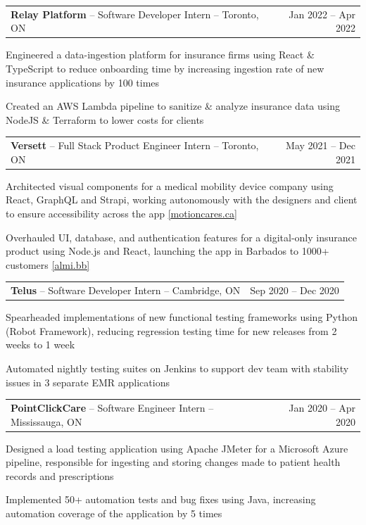 \documentclass[letterpaper,10pt]{article}
\makeatletter
\newcommand{\entry}[2]{%
  \noindent\begin{tabularx}{\linewidth}{@{}X r@{}}
    #1 & #2 \\
  \end{tabularx}%
}
\makeatother
\begin{document}
\entry{\textbf{Relay Platform} -- Software Developer Intern -- Toronto, ON}{Jan 2022 -- Apr 2022}
\begin{tight}
  \item Engineered a data-ingestion platform for insurance firms using React \& TypeScript to reduce onboarding time by increasing ingestion rate of new insurance applications by 100 times
  \item Created an AWS Lambda pipeline to sanitize \& analyze insurance data using NodeJS \& Terraform to lower costs for clients
\end{tight}

\entry{\textbf{Versett} -- Full Stack Product Engineer Intern -- Toronto, ON}{May 2021 -- Dec 2021}
\begin{tight}
  \item Architected visual components for a medical mobility device company using React, GraphQL and Strapi, working autonomously with the designers and client to ensure accessibility across the app \href{https://motioncares.ca}{[motioncares.ca]}
  \item Overhauled UI, database, and authentication features for a digital-only insurance product using Node.js and React, launching the app in Barbados to 1000+ customers \href{https://almi.bb}{[almi.bb]}
\end{tight}

\entry{\textbf{Telus} -- Software Developer Intern -- Cambridge, ON}{Sep 2020 -- Dec 2020}
\begin{tight}
  \item Spearheaded implementations of new functional testing frameworks using Python (Robot Framework), reducing regression testing time for new releases from 2 weeks to 1 week
  \item Automated nightly testing suites on Jenkins to support dev team with stability issues in 3 separate EMR applications
\end{tight}

\entry{\textbf{PointClickCare} -- Software Engineer Intern -- Mississauga, ON}{Jan 2020 -- Apr 2020}
\begin{tight}
  \item Designed a load testing application using Apache JMeter for a Microsoft Azure pipeline, responsible for ingesting and storing changes made to patient health records and prescriptions
  \item Implemented 50+ automation tests and bug fixes using Java, increasing automation coverage of the application by 5 times
\end{tight}
\end{document}

